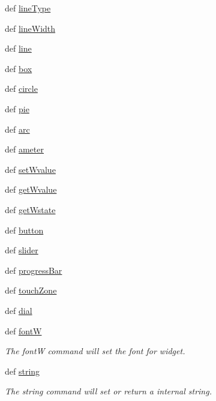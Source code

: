 \begin{DoxyCompactItemize}
\item 
def \hyperlink{namespaceez_l_c_d3xx_a9dc821ce2652535899c584d4ff1c1bf7}{line\-Type}
\item 
def \hyperlink{namespaceez_l_c_d3xx_a87b2625e7e4ffa927b4471003f8c6e70}{line\-Width}
\item 
def \hyperlink{namespaceez_l_c_d3xx_ae70c22a0a810a70a0dd6d32c9fd7c066}{line}
\item 
def \hyperlink{namespaceez_l_c_d3xx_a63bb01e1f5ef0fe2ae2acec0ed90e5bd}{box}
\item 
def \hyperlink{namespaceez_l_c_d3xx_abfcfb31f2d88c7397332abcc6b324c7c}{circle}
\item 
def \hyperlink{namespaceez_l_c_d3xx_a12fb93d2d6f7ce3f08ad988c09624d57}{pie}
\item 
def \hyperlink{namespaceez_l_c_d3xx_a13a0a8fb9c906a687f2a42864d973cc1}{arc}
\item 
def \hyperlink{namespaceez_l_c_d3xx_a01020dc360dfbd9f463bf5478e42566e}{ameter}
\item 
def \hyperlink{namespaceez_l_c_d3xx_ad1dcc969fcb6dadef212347058c26742}{set\-Wvalue}
\item 
def \hyperlink{namespaceez_l_c_d3xx_a30f9351d59386e55fd104c08fc111461}{get\-Wvalue}
\item 
def \hyperlink{namespaceez_l_c_d3xx_a624a7f4a6b2a9021898a5e9d8dd0798b}{get\-Wstate}
\item 
def \hyperlink{namespaceez_l_c_d3xx_a7eeeb3ce522c7891c3f76cdc79f11192}{button}
\item 
def \hyperlink{namespaceez_l_c_d3xx_afce5d2b8d149e7d84a27ca9740baefe3}{slider}
\item 
def \hyperlink{namespaceez_l_c_d3xx_a1e17ba92ebcd90504fdc0f8fddb84bf0}{progress\-Bar}
\item 
def \hyperlink{namespaceez_l_c_d3xx_a7a2150ae399ca581088ac55f421731cb}{touch\-Zone}
\item 
def \hyperlink{namespaceez_l_c_d3xx_a8691bfb0f80929f4b4e09a83697532b8}{dial}
\item 
def \hyperlink{namespaceez_l_c_d3xx_ae5afb2a11476aad1d2cc0293d8e68717}{font\-W}
\begin{DoxyCompactList}\small\item\em The font\-W command will set the font for widget. \end{DoxyCompactList}\item 
def \hyperlink{namespaceez_l_c_d3xx_a606e61e5ba0ea6ae6ada021e7c021b39}{string}
\begin{DoxyCompactList}\small\item\em The string command will set or return a internal string. \end{DoxyCompactList}\item 

\end{DoxyCompactItemize}
